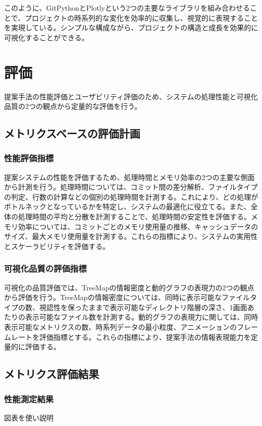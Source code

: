\documentclass[12pt,twoside]{jbook}
\begin{document}
このように、GitPythonとPlotlyという2つの主要なライブラリを組み合わせることで、プロジェクトの時系列的な変化を効率的に収集し、視覚的に表現することを実現している。シンプルな構成ながら、プロジェクトの構造と成長を効果的に可視化することができる。

\chapter{評価}
提案手法の性能評価とユーザビリティ評価のため、システムの処理性能と可視化品質の2つの観点から定量的な評価を行う。

\section{メトリクスベースの評価計画}

\subsection{性能評価指標}
提案システムの性能を評価するため、処理時間とメモリ効率の2つの主要な側面から計測を行う。処理時間については、コミット間の差分解析、ファイルタイプの判定、行数の計算などの個別の処理時間を計測する。これにより、どの処理がボトルネックとなっているかを特定し、システムの最適化に役立てる。また、全体の処理時間の平均と分散を計測することで、処理時間の安定性を評価する。メモリ効率については、コミットごとのメモリ使用量の推移、キャッシュデータのサイズ、最大メモリ使用量を計測する。これらの指標により、システムの実用性とスケーラビリティを評価する。

\subsection{可視化品質の評価指標}
可視化の品質評価では、TreeMapの情報密度と動的グラフの表現力の2つの観点から評価を行う。TreeMapの情報密度については、同時に表示可能なファイルタイプの数、視認性を保ったままで表示可能なディレクトリ階層の深さ、1画面あたりの表示可能なファイル数を計測する。動的グラフの表現力に関しては、同時表示可能なメトリクスの数、時系列データの最小粒度、アニメーションのフレームレートを評価指標とする。これらの指標により、提案手法の情報表現能力を定量的に評価する。

\section{メトリクス評価結果}
\subsection{性能測定結果}
図表を使い説明
\end{document}
